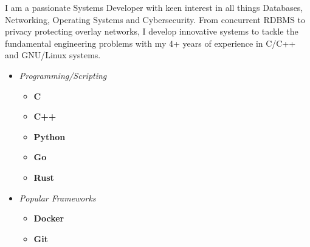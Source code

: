 \documentclass[9]{Resume}
\begin{document}
\begin{minipage}[t]{0.45\textwidth}
	\vspace{-\baselineskip}

		I am a passionate Systems Developer with keen interest in all things Databases, Networking, Operating Systems and Cybersecurity. From concurrent RDBMS to privacy protecting overlay networks, I develop innovative systems to tackle the fundamental engineering problems with my 4+ years of experience in C/C++ and GNU/Linux systems.
\end{minipage}
\hfill
\begin{minipage}[t]{0.45\textwidth}
	\vspace{-\baselineskip}

	\begin{itemize}[noitemsep,nolistsep,leftmargin=*]
	\setlength\itemsep{-1em}
	\item[]\textit{Programming/Scripting}
			\vspace{-1em}
			\begin{multicols}{2}
			\begin{itemize}[leftmargin=*]
			\setlength\itemsep{-0.25em}
				\item[]\textbf{C}\hspace{48pt}
				\item[]\textbf{C++}\hspace{37pt}
				\item[]\textbf{Python}\hspace{25pt}
				\item[]\textbf{Go}\hspace{28pt}
				\item[]\textbf{Rust}\hspace{21pt}
			\end{itemize}
			\end{multicols}

	\item[]\textit{Popular Frameworks}
			\vspace{-1em}
			\begin{multicols}{2}
			\begin{itemize}[leftmargin=*]
			\setlength\itemsep{-0.25em}
				\item[]\textbf{Docker}\hspace{25pt}\meter{4}
				\item[]\textbf{Git}\hspace{27pt}\meter{4}
			\end{itemize}
			\end{multicols}


\end{itemize}
\end{minipage}
\end{document}
